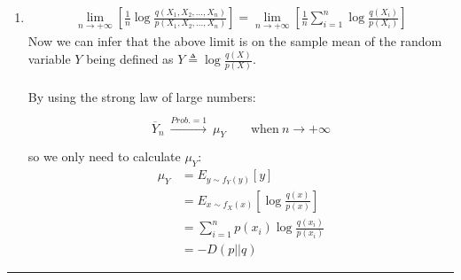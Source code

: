 \documentclass[12pt, letterpaper]{scrartcl}
\begin{document}
\begin{enumerate}[((a))]
    \item 
    \begin{align*}
        \lim_{n\rightarrow+\infty}\left[\frac{1}{n}\log\frac{q(X_1,X_2,\dots,X_n)}{p(X_1,X_2,\dots,X_n)}\right]=\lim_{n\rightarrow+\infty}\left[\frac{1}{n}\sum_{i=1}^n\log\frac{q(X_i)}{p(X_i)}\right]
    \end{align*}
    Now we can infer that the above limit is on the sample mean of the random variable $Y$ being defined as $Y\triangleq\log\frac{q(X)}{p(X)}$.\\\\
    By using the strong law of large numbers:
    \begin{align*}
        \begin{matrix}{}\\{\overline {Y}}_{n}\ {\xrightarrow {Prob.=1}}\ \mu_Y \qquad {\textrm {when}}\ n\to +\infty\\{}\end{matrix}
    \end{align*}
    so we only need to calculate $\mu_Y$:
    \begin{align*}
        \mu_Y&=E_{y\sim f_Y(y)}[y]\\
        &=E_{x\sim f_X(x)}[\log\frac{q(x)}{p(x)}]\\
        &=\sum_{i=1}^{n}p(x_i)\log\frac{q(x_i)}{p(x_i)}\\
        &=-D(p||q)
    \end{align*}
\end{enumerate}
\hrule
\end{document}
